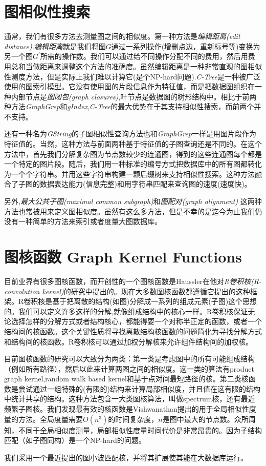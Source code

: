 \documentclass{article}
\begin{document}
\section{图相似性搜索}
通常，我们有很多方法去测量图之间的相似度。第一种方法是\emph{编辑距离(edit distance)}.\emph{编辑距离}就是我们将图$G$通过一系列操作(增删点边，重新标号等)变换为另一个图$G^{'}$所需的操作数。我们可以通过给不同操作分配不同的费用，然后用费用总和当做距离来调整这个方法的准确度。虽然编辑距离是一种非常直观的图相似性测度方法，但是实际上我们难以计算它(是个NP-hard问题).\emph{C-Tree}\cite{C-Tree}是一种被广泛使用的图索引模型。它没有使用图的片段信息作为特征值，而是把数据图组织在一种内部节点是\emph{图闭包(graph closures)},叶节点是数据图的树形结构中。相比于前两种方法\emph{GraphGrep}和\emph{gIndex},\emph{C-Tree}的最大优势在于其支持相似性搜索，而前两个并不支持。

还有一种名为\emph{GString}的子图相似性查询方法也和\emph{GraphGrep}一样是用图片段作为特征值的。当然，这种方法与前面两种基于特征值的子图查询还是不同的。在这个方法中，首先我们分解复杂图为节点数较少的连通图，得到的这些连通图每个都是一个特定的图片段。随后，我们用一种标准的编号方式把数据库中的所有图都转化为一个个字符串。并用这些字符串构建一颗后缀树来支持相似性搜索。这种方法融合了子图的数据表达能力(信息完整)和用字符串匹配来查询图的速度(速度快)。

另外,\emph{最大公共子图(maximal common subgraph)}\cite{mcs}和\emph{图配对(graph alignment)}\cite{assignment,assigment08} 这两种方法也常被用来定义图相似度。虽然有这么多方法，但是不幸的是迄今为止我们仍没有一种简单的方法来索引或者度量大图数据库。

\section{图核函数 Graph Kernel Functions}
目前业界有很多图核函数，而开创性的一个图核函数是Haussler在他对\emph{R卷积核(R-convolution kernel)}的研究中提出的。现在大多数图核函数都遵循它提出的这种框架。R卷积核是基于把离散的结构(如图)分解成一系列的组成元素(子图)这个思想的。我们可以定义许多这样的分解,就像组成结构中的核心一样。R卷积核保证无论选择怎样的分解方式或者结构核心，都能得要一个对称半正定的函数，或者一个结构间的核函数。这个关键性质将寻找离散结构核函数的问题简化为寻找分解方式和结构间的核函数。R卷积核可以通过加权分解核来允许组件结构间的加权核。

目前图核函数的研究可以大致分为两类：第一类是考虑图中的所有可能组成结构（例如所有路径），然后以此来计算两图之间的相似度。这一类的算法有product graph kernel,random walk based kernel和基于点对间最短路径的核。第二类核函数是尝试通过一组特殊的(有限的)结构来计算局部相似度，并且值在这有限的结构中统计共享的结构。这种方法包含一大类图核算法，叫做spectrum核，还有最近频繁子图核。我们发现最有效的核函数是Vishwanathan提出的用于全局相似性度量的方法。全局度量需要$O(n^3 )$的时间复杂度，$n$是图中最大的节点数。众所周知，不同于全局相似度测量，局部相似性度量时间代价是非常昂贵的。因为子结构匹配（如子图同构）是一个NP-hard的问题。

我们采用一个最近提出的图小波匹配核，并将其扩展使其能在大数据库运行。

\ifx\allfiles\undefined
%
%
\end{document}

